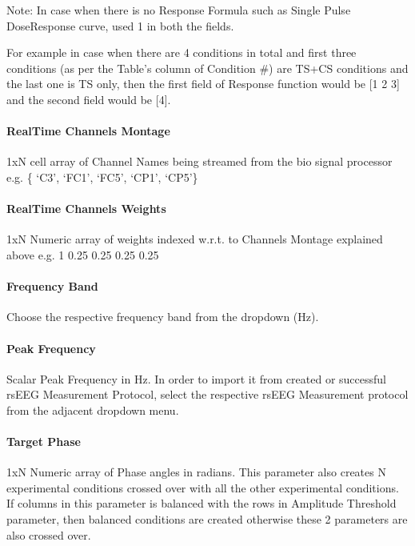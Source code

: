 \documentclass[letterpaper,10pt,english]{sphinxmanual}
\begin{document}
\sphinxAtStartPar
Note: In case when there is no Response Formula such as Single Pulse Dose\sphinxhyphen{}Response curve, used 1 in both the fields.

\sphinxAtStartPar
For example in case when there are 4 conditions in total and first three conditions (as per the Table’s column of Condition \#) are TS+CS conditions and the last one is TS only, then the first field of Response function would be {[}1 2 3{]} and the second field would be {[}4{]}.


\paragraph{Real\sphinxhyphen{}Time Channels Montage}
\label{\detokenize{8_MEPDoseResponseCurve:real-time-channels-montage}}
\sphinxAtStartPar
1xN cell array of Channel Names being streamed from the bio signal processor e.g. \{ ‘C3’, ‘FC1’, ‘FC5’, ‘CP1’, ‘CP5’\}


\paragraph{Real\sphinxhyphen{}Time Channels Weights}
\label{\detokenize{8_MEPDoseResponseCurve:real-time-channels-weights}}
\sphinxAtStartPar
1xN Numeric array of weights indexed w.r.t. to Channels Montage explained above e.g. 1 \sphinxhyphen{}0.25 \sphinxhyphen{}0.25 \sphinxhyphen{}0.25 \sphinxhyphen{}0.25


\paragraph{Frequency Band}
\label{\detokenize{8_MEPDoseResponseCurve:frequency-band}}
\sphinxAtStartPar
Choose the respective frequency band from the dropdown (Hz).


\paragraph{Peak Frequency}
\label{\detokenize{8_MEPDoseResponseCurve:peak-frequency}}
\sphinxAtStartPar
Scalar Peak Frequency in Hz. In order to import it from created or successful rsEEG Measurement Protocol, select the respective rsEEG Measurement protocol from the adjacent dropdown menu.


\paragraph{Target Phase}
\label{\detokenize{8_MEPDoseResponseCurve:target-phase}}
\sphinxAtStartPar
1xN Numeric array of Phase angles in radians. This parameter also creates N experimental conditions crossed over with all the other experimental conditions. If columns in this parameter is balanced with the rows in Amplitude Threshold parameter, then balanced conditions are created otherwise these 2 parameters are also crossed over.
\end{document}

